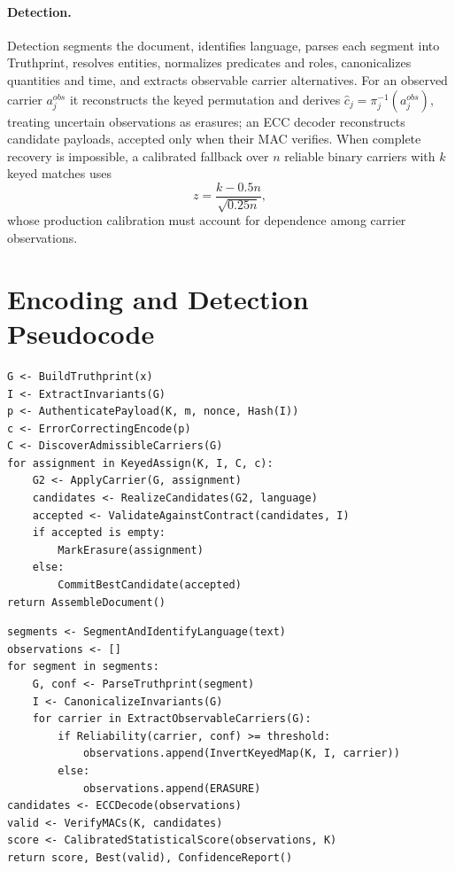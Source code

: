 \documentclass[11pt]{article}
\begin{document}
\paragraph{Detection.} Detection segments the document, identifies language, parses each segment into Truthprint, resolves entities, normalizes predicates and roles, canonicalizes quantities and time, and extracts observable carrier alternatives. For an observed carrier $a_j^{obs}$ it reconstructs the keyed permutation and derives $\hat{c}_j=\pi_j^{-1}(a_j^{obs})$, treating uncertain observations as erasures; an ECC decoder reconstructs candidate payloads, accepted only when their MAC verifies. When complete recovery is impossible, a calibrated fallback over $n$ reliable binary carriers with $k$ keyed matches uses
\begin{equation}
z=\frac{k-0.5n}{\sqrt{0.25n}},
\label{eq:zscore}
\end{equation}
whose production calibration must account for dependence among carrier observations.

\section{Encoding and Detection Pseudocode}
\label{app:pseudocode}
\begin{lstlisting}[caption={Truthprint encoding pseudocode.}]
G <- BuildTruthprint(x)
I <- ExtractInvariants(G)
p <- AuthenticatePayload(K, m, nonce, Hash(I))
c <- ErrorCorrectingEncode(p)
C <- DiscoverAdmissibleCarriers(G)
for assignment in KeyedAssign(K, I, C, c):
    G2 <- ApplyCarrier(G, assignment)
    candidates <- RealizeCandidates(G2, language)
    accepted <- ValidateAgainstContract(candidates, I)
    if accepted is empty:
        MarkErasure(assignment)
    else:
        CommitBestCandidate(accepted)
return AssembleDocument()
\end{lstlisting}
\begin{lstlisting}[caption={Truthprint detection pseudocode.}]
segments <- SegmentAndIdentifyLanguage(text)
observations <- []
for segment in segments:
    G, conf <- ParseTruthprint(segment)
    I <- CanonicalizeInvariants(G)
    for carrier in ExtractObservableCarriers(G):
        if Reliability(carrier, conf) >= threshold:
            observations.append(InvertKeyedMap(K, I, carrier))
        else:
            observations.append(ERASURE)
candidates <- ECCDecode(observations)
valid <- VerifyMACs(K, candidates)
score <- CalibratedStatisticalScore(observations, K)
return score, Best(valid), ConfidenceReport()
\end{lstlisting}
\end{document}
